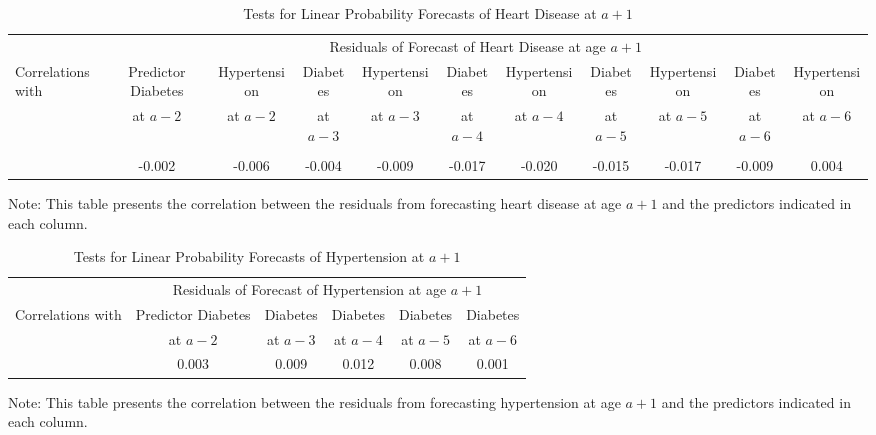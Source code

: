 \begin{landscape}

\begin{table}[H]
\begin{threeparttable}
\caption{Tests for Linear Probability Forecasts of Heart Disease at $a+1$} \label{table:1storderresidsheart}
\scriptsize
\centering
\begin{tabular}{lcccccccccc} \toprule
& \multicolumn{10}{c}{Residuals of Forecast of Heart Disease at age $a+1$} \\
Correlations with	&	Predictor Diabetes &	Hypertension &	Diabetes &	Hypertension &	Diabetes	&	Hypertension &	Diabetes & Hypertension & Diabetes & Hypertension \\
                    &	at $a - 2$ &	at $a - 2$		&	at $a - 3$ & at $a - 3$		& at $a - 4$		& at $a - 4$		& at $a - 5$	& at $a - 5$	& at $a - 6$	& at $a - 6$	\\

\midrule \\
&	-0.002	&	-0.006	&	-0.004	& -0.009 &	-0.017	& -0.020	&	-0.015	&	-0.017 &-0.009	&	0.004	\\
\bottomrule
\end{tabular}
\begin{tablenotes}
\footnotesize
\item Note: This table presents the correlation between the residuals from forecasting heart disease at age $a+1$ and the predictors indicated in each column.
\end{tablenotes}
\end{threeparttable}
\end{table}

\begin{table}[H]
\begin{threeparttable}
\caption{Tests for Linear Probability Forecasts of Hypertension at $a+1$} \label{table:1storderresidshyper}
\centering
\scriptsize
\begin{tabular}{lccccc} \toprule
& \multicolumn{5}{c}{Residuals of Forecast of Hypertension at age $a+1$} \\
Correlations with	&	Predictor Diabetes & Diabetes & Diabetes & Diabetes & Diabetes 	\\
                    & at $a - 2$	& at $a - 3$	& at $a - 4$	& at $a - 5$	& at $a - 6$	\\
\midrule
&	0.003	& 0.009	&	0.012	&	0.008	&	0.001	\\
\bottomrule
\end{tabular}
\begin{tablenotes}
\footnotesize
\item Note: This table presents the correlation between the residuals from forecasting hypertension at age $a+1$ and the predictors indicated in each column.
\end{tablenotes}
\end{threeparttable}
\end{table}


\end{landscape}

